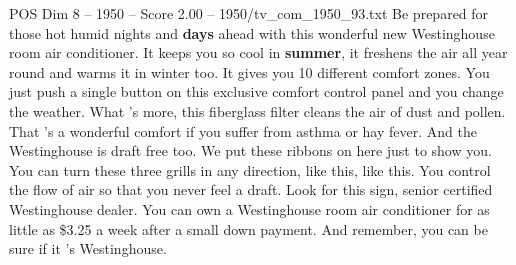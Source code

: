 \begin{textsample}{POS Dim 8 – 1950 – Score 2.00 – 1950/tv\_com\_1950\_93.txt}  \label{ex:f8_pos_018}
Be prepared for those hot humid nights and \textbf{days} ahead with this wonderful new Westinghouse room air conditioner.
It keeps you so cool in \textbf{summer}, it freshens the air all year round and warms it in winter too.
It gives you 10 different comfort zones.
You just push a single button on this exclusive comfort control panel and you change the weather.
What 's more, this fiberglass filter cleans the air of dust and pollen.
That 's a wonderful comfort if you suffer from asthma or hay fever.
And the Westinghouse is draft free too.
We put these ribbons on here just to show you.
You can turn these three grills in any direction, like this, like this.
You control the flow of air so that you never feel a draft.
Look for this sign, senior certified Westinghouse dealer.
You can own a Westinghouse room air conditioner for as little as \$3.25 a week after a small down payment.
And remember, you can be sure if it 's Westinghouse.

\end{textsample}
